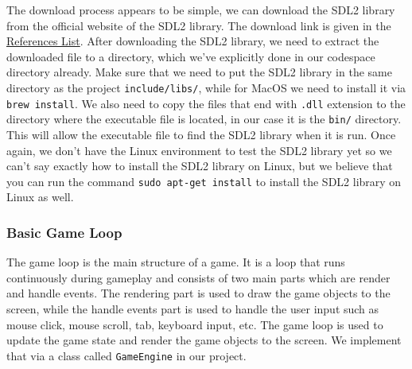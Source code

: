 \hspace{1cm} The download process appears to be simple, we can download the SDL2 library from the official website of the SDL2 library. The download link is given in the \hyperref[sec:references-list]{References List}. After downloading the SDL2 library, we need to extract the downloaded file to a directory, which we've explicitly done in our codespace directory already. Make sure that we need to put the SDL2 library in the same directory as the project \texttt{include/libs/}, while for MacOS we need to install it via \texttt{brew install}. We also need to copy the files that end with \texttt{.dll} extension to the directory where the executable file is located, in our case it is the \texttt{bin/} directory. This will allow the executable file to find the SDL2 library when it is run. Once again, we don't have the Linux environment to test the SDL2 library yet so we can't say exactly how to install the SDL2 library on Linux, but we believe that you can run the command \texttt{sudo apt-get install} to install the SDL2 library on Linux as well. 

\subsubsection{Basic Game Loop}
\label{subsubsec:basic-game-loop}

\hspace{1cm} The game loop is the main structure of a game. It is a loop that runs continuously during gameplay and consists of two main parts which are render and handle events. The rendering part is used to draw the game objects to the screen, while the handle events part is used to handle the user input such as mouse click, mouse scroll, tab, keyboard input, etc. The game loop is used to update the game state and render the game objects to the screen. We implement that via a class called \texttt{GameEngine} in our project.
\vspace{0.5cm}

